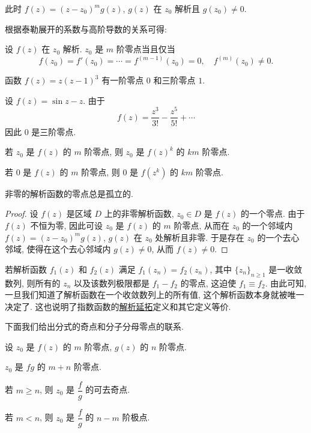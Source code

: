 此时 $f(z)=(z-z_0)^mg(z)$, $g(z)$ 在 $z_0$ 解析且 $g(z_0)\neq 0$.

根据泰勒展开的系数与高阶导数的关系可得:

\begin{theorem}
  设 $f(z)$ 在 $z_0$ 解析.
  $z_0$ 是 $m$ 阶零点当且仅当
  \[
    f(z_0)=f'(z_0)=\cdots=f^{(m-1)}(z_0)=0,\quad
    f^{(m)}(z_0)\neq 0.
  \]
\end{theorem}

\begin{example}\delspace
  \begin{enumnopar}
    \item 函数 $f(z)=z(z-1)^3$ 有一阶零点 $0$ 和三阶零点 $1$.
    \item 设 $f(z)=\sin z-z$.
      由于
      \[
        f(z)=\frac{z^3}{3!}-\frac{z^5}{5!}+\cdots
      \]
      因此 $0$ 是三阶零点.
    \item 若 $z_0$ 是 $f(z)$ 的 $m$ 阶零点, 则 $z_0$ 是 $f(z)^k$ 的 $km$ 阶零点.
    \item 若 $0$ 是 $f(z)$ 的 $m$ 阶零点, 则 $0$ 是 $f(z^k)$ 的 $km$ 阶零点.
  \end{enumnopar}
\end{example}

\begin{theorem}\label{thm:zero-isolated}
  非零的解析函数的零点总是孤立的.
\end{theorem}

\begin{proof}
  设 $f(z)$ 是区域 $D$ 上的非零解析函数, $z_0\in D$ 是 $f(z)$ 的一个零点.
  由于 $f(z)$ 不恒为零, 因此可设 $z_0$ 是 $f(z)$ 的 $m$ 阶零点, 从而在 $z_0$ 的一个邻域内 $f(z)=(z-z_0)^m g(z)$, $g(z)$ 在 $z_0$ 处解析且非零.
  于是存在 $z_0$ 的一个去心邻域, 使得在这个去心邻域内 $g(z)\neq0$, 从而 $f(z)\neq 0$.
\end{proof}

若解析函数 $f_1(z)$ 和 $f_2(z)$ 满足 $f_1(z_n)=f_2(z_n)$, 其中 $\{z_n\}_{n\ge1}$ 是一收敛数列, 则所有的 $z_n$ 以及该数列极限都是 $f_1-f_2$ 的零点, 这迫使 $f_1\equiv f_2$.
由此可知, 一旦我们知道了解析函数在一个收敛数列上的所有值, 这个解析函数本身就被唯一决定了.
这也说明了指数函数的\hyperref[enum:exp-expansion]{解析延拓}定义和其它定义等价.

下面我们给出分式的奇点和分子分母零点的联系.

\begin{theorem}[可去奇点和极点判定方法]
  设 $z_0$ 是 $f(z)$ 的 $m$ 阶零点, $g(z)$ 的 $n$ 阶零点.
  \begin{enumpar}
    \item $z_0$ 是 $fg$ 的 $m+n$ 阶零点.
    \item 若 $m\ge n$, 则 $z_0$ 是 $\dfrac fg$ 的可去奇点.
    \item 若 $m<n$, 则 $z_0$ 是 $\dfrac fg$ 的 $n-m$ 阶极点.
  \end{enumpar}
\end{theorem}

